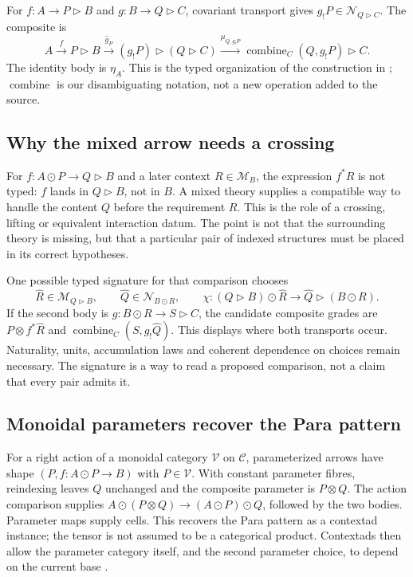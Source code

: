 \documentclass[11pt,letterpaper]{article}
\newcommand{\ext}{\mathbin{\odot}}
\newcommand{\cext}{\mathbin{\triangleright}}
\newcommand{\comb}{\operatorname{combine}}
\begin{document}
For $f:A\to P\cext B$ and $g:B\to Q\cext C$, covariant transport gives $g_!P\in\mathcal N_{Q\cext C}$. The composite is
\begin{equation}\label{eq:cntcomp}
A\xrightarrow{f}P\cext B
 \xrightarrow{\widehat g_P}(g_!P)\cext(Q\cext C)
 \xrightarrow{\mu_{Q,g_!P}}\comb_C(Q,g_!P)\cext C.
\end{equation}
The identity body is $\eta_A$. This is the typed organization of the construction in \cite[Definitions 6.1--6.3 and equation (6.1.8)]{CM}; $\comb$ is our disambiguating notation, not a new operation added to the source.

\subsection{Why the mixed arrow needs a crossing}
For $f:A\ext P\to Q\cext B$ and a later context $R\in\mathcal M_B$, the expression $f^*R$ is not typed: $f$ lands in $Q\cext B$, not in $B$. A mixed theory supplies a compatible way to handle the content $Q$ before the requirement $R$. This is the role of a crossing, lifting or equivalent interaction datum. The point is not that the surrounding theory is missing, but that a particular pair of indexed structures must be placed in its correct hypotheses.

One possible typed signature for that comparison chooses
\[
\widehat R\in\mathcal M_{Q\cext B},\qquad
\widehat Q\in\mathcal N_{B\ext R},\qquad
\chi:(Q\cext B)\ext\widehat R\to\widehat Q\cext(B\ext R).
\]
If the second body is $g:B\ext R\to S\cext C$, the candidate composite grades are $P\otimes f^*\widehat R$ and $\comb_C(S,g_!\widehat Q)$. This displays where both transports occur. Naturality, units, accumulation laws and coherent dependence on choices remain necessary. The signature is a way to read a proposed comparison, not a claim that every pair admits it.

\subsection{Monoidal parameters recover the Para pattern}
For a right action of a monoidal category $\mathcal V$ on $\mathcal C$, parameterized arrows have shape $(P,f:A\ext P\to B)$ with $P\in\mathcal V$. With constant parameter fibres, reindexing leaves $Q$ unchanged and the composite parameter is $P\otimes Q$. The action comparison supplies $A\ext(P\otimes Q)\to(A\ext P)\ext Q$, followed by the two bodies. Parameter maps supply cells. This recovers the Para pattern as a contextad instance; the tensor is not assumed to be a categorical product. Contextads then allow the parameter category itself, and the second parameter choice, to depend on the current base \cite[Section 3]{CM}.
\end{document}
